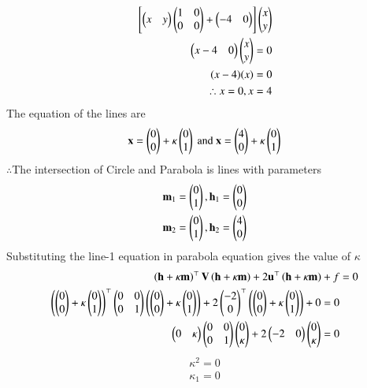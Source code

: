 \documentclass[journal]{IEEEtran}
\begin{document}
\begin{align}
    \sbrak{\myvec{x & y}\myvec{1 & 0 \\ 0 & 0} + \myvec{-4 & 0}}\myvec{x \\ y}  \\
    \myvec{x-4 & 0}\myvec{x \\ y } = 0 \\
    (x -4)(x) = 0 \\
    \therefore x = 0, x = 4
\end{align}
The equation of the lines are
\begin{align}
    \vec{x} = \myvec{0 \\ 0} + \kappa\myvec{0 \\ 1} \text{ and }
    \vec{x} = \myvec{4 \\ 0} + \kappa\myvec{0 \\ 1}
\end{align}
$\therefore $The intersection of Circle and Parabola is lines with parameters
\begin{align}
\vec{m}_1 = \myvec{0 \\ 1}, \vec{h}_1 = \myvec{0 \\ 0} \\
\vec{m}_2 = \myvec{0 \\ 1}, \vec{h}_2 = \myvec{4 \\ 0}
\end{align}
Substituting the line-1 equation in parabola equation gives the value of $\kappa$
\begin{align}
\brak{\vec{h}+\kappa\vec{m}}^\top\vec{V}\brak{\vec{h}+\kappa\vec{m}} + 2\vec{u}^\top\brak{\vec{h}+\kappa\vec{m}} + f &= 0 \\
\brak{\myvec{0 \\ 0} + \kappa \myvec{0\\1}}^\top \myvec{ 0&0\\0&1}\brak{\myvec{0 \\ 0}+ \kappa \myvec{0\\1}} + 2\myvec{-2\\0}^\top \brak{\myvec{0 \\ 0} + \kappa \myvec{0\\1}} + 0 = 0 \\
\myvec{0 & \kappa}\myvec{0 & 0 \\ 0 &1}\myvec{0 \\ \kappa} + 2\myvec{-2 & 0}\myvec{0 \\ \kappa} = 0
\end{align}
\begin{align}
    \kappa^2 = 0 \\
    \kappa_1 = 0
\end{align}
\end{document}
